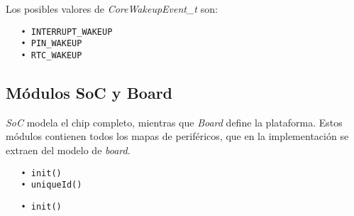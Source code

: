 Los posibles valores de \emph{CoreWakeupEvent\_t} son:

\begin{verbatim}
   • INTERRUPT_WAKEUP
   • PIN_WAKEUP
   • RTC_WAKEUP
\end{verbatim} 








\subsection{Módulos SoC y Board}

\emph{SoC} modela el chip completo, mientras que \emph{Board} define la plataforma. Estos módulos contienen todos los mapas de periféricos, que en la implementación se extraen del modelo de \emph{board}.


\begin{verbatim}
   • init()
   • uniqueId()
\end{verbatim} 


\begin{verbatim}
   • init()
\end{verbatim} 


